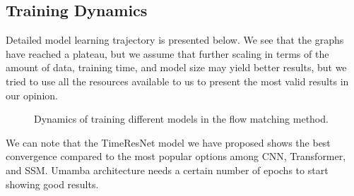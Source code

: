 \documentclass{article}
\begin{document}
\subsection{Training Dynamics}
Detailed model learning trajectory is presented below. We see that the graphs have reached a plateau, but we assume that further scaling in terms of the amount of data, training time, and model size may yield better results, but we tried to use all the resources available to us to present the most valid results in our opinion.

\begin{figure}[h!]
    \centering

    \begin{minipage}[t]{0.48\linewidth}
        \centering
        \caption{Dynamics of training different models in the regression task.}
        \label{fig:reg_loss}
    \end{minipage}
    \hfill
    \begin{minipage}[t]{0.48\linewidth}
        \centering
        \caption{Dynamics of training model in the diffusion task.}
        \label{fig:dif_loss}
    \end{minipage}

    \vspace{1em}

    \begin{minipage}[t]{0.65\linewidth}
        \centering
        \caption{Dynamics of training different models in the flow matching method.}
        \label{fig:flow_loss}
    \end{minipage}
\end{figure}

We can note that the TimeResNet model we have proposed shows the best convergence compared to the most popular options among CNN, Transformer, and SSM. Umamba architecture needs a certain number of epochs to start showing good results.

\end{document}
